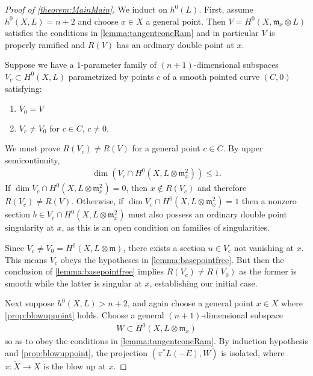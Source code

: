 \documentclass[11pt,reqno]{amsart}
\theoremstyle{plain}
\theoremstyle{definition}
\theoremstyle{remark}
\numberwithin{equation}{section}
\DeclareMathOperator{\dm}{dim}
\renewcommand{\to}{{\longrightarrow}}
\numberwithin{equation}{section}
\begin{document}
\begin{proof}[Proof of \autoref{theorem:MainMain}]
  We induct on $h^{0}(L)$.  First, assume $h^{0}(X,L) = n+2$ and choose $x \in X$ a general point. Then $V  =  H^{0}(X,{\mathfrak m}_{x}\otimes L)$ satisfies the conditions in \autoref{lemma:tangentconeRam} and in particular $V$ is properly ramified and $R(V)$ has an ordinary double point at $x$.  

  Suppose we have a $1$-parameter family of $(n+1)$-dimensional subspaces $V_{c} \subset H^{0}(X,L)$ parametrized by points $c$ of a smooth pointed curve $(C,0)$ satisfying:
  \begin{enumerate}
  \item $V_{0} = V$ 
  \item $V_{c} \neq V_{0}$ for $c \in C$, $c \neq 0$.
  \end{enumerate}
  We must prove $R(V_{c}) \neq R(V)$ for a general point $c \in C$. By upper semicontinuity, 
  \begin{align*}
    \dm \left(V_{c} \cap H^{0}(X,L \otimes \mathfrak{m}^{2}_{x})\right) \leq 1.
  \end{align*}
If $\dm V_{c} \cap H^{0}(X,L \otimes \mathfrak{m}^{2}_{x}) = 0$, then $x \notin R(V_{c})$ and therefore $R(V_{c}) \neq R(V)$.  Otherwise, if $\dm V_{c} \cap H^{0}(X,L \otimes \mathfrak{m}^{2}_{x}) = 1$ then a nonzero section $b \in V_{c} \cap H^{0}(X,L \otimes \mathfrak{m}^{2}_{x})$ must also possess an ordinary double point singularity at $x$, as this is an open condition on families of singularities.

Since $V_{c} \neq V_{0} = H^{0}(X,L\otimes\mathfrak{m})$, there exists a section $u \in V_{c}$ not vanishing at $x$.  This means $V_{c}$ obeys the hypotheses in \autoref{lemma:basepointfree}. But then the conclusion of \autoref{lemma:basepointfree} implies $R(V_{c}) \neq R(V_{0})$ as the former is smooth while the latter is singular at $x$, establishing our initial case.


Next suppose $h^{0}(X,L) > n+2$, and again choose a general point $x \in X$ where \autoref{prop:blowuppoint} holds. Choose a general $(n+1)$-dimensional subspace 
\begin{align*}
  W \subset  H^{0}(X, L \otimes {\mathfrak m}_{x})
\end{align*}
so as to obey the conditions in \autoref{lemma:tangentconeRam}. By induction hypothesis and \autoref{prop:blowuppoint}, the projection $(\pi^{*}L(-E),W)$ is isolated, where $\pi: \widetilde{X} \to X$ is the blow up at $x$.  


\end{proof}
\end{document}
